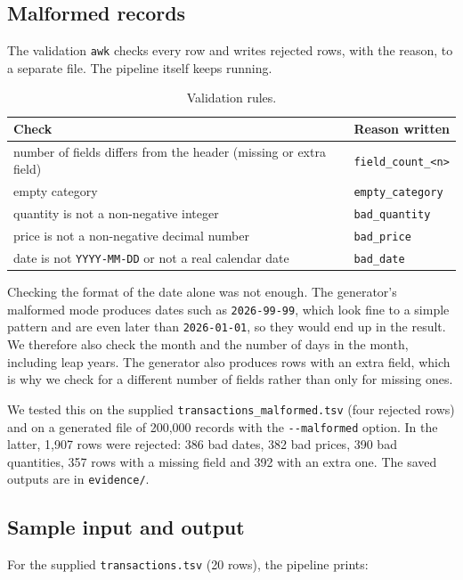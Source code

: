 \documentclass[11pt,a4paper]{article}
\newcommand{\file}[1]{\texttt{#1}}
\begin{document}
\subsection{Malformed records}

The validation \file{awk} checks every row and writes rejected rows, with the
reason, to a separate file. The pipeline itself keeps running.

\begin{table}[H]
\centering
\small
\begin{tabularx}{\textwidth}{@{}Xl@{}}
\toprule
Check & Reason written \\
\midrule
number of fields differs from the header (missing or extra field) & \file{field\_count\_<n>} \\
empty category & \file{empty\_category} \\
quantity is not a non-negative integer & \file{bad\_quantity} \\
price is not a non-negative decimal number & \file{bad\_price} \\
date is not \file{YYYY-MM-DD} or not a real calendar date & \file{bad\_date} \\
\bottomrule
\end{tabularx}
\caption{Validation rules.}
\end{table}

Checking the format of the date alone was not enough. The generator's
malformed mode produces dates such as \file{2026-99-99}, which look fine to a
simple pattern and are even later than \file{2026-01-01}, so they would end up
in the result. We therefore also check the month and the number of days in
the month, including leap years. The generator also produces rows with an
extra field, which is why we check for a different number of fields rather
than only for missing ones.

We tested this on the supplied \file{transactions\_malformed.tsv} (four
rejected rows) and on a generated file of 200{,}000 records with the
\file{-{}-malformed} option. In the latter, 1{,}907 rows were rejected: 386 bad
dates, 382 bad prices, 390 bad quantities, 357 rows with a missing field and
392 with an extra one. The saved outputs are in \file{evidence/}.

\subsection{Sample input and output}

For the supplied \file{transactions.tsv} (20 rows), the pipeline prints:
\end{document}
